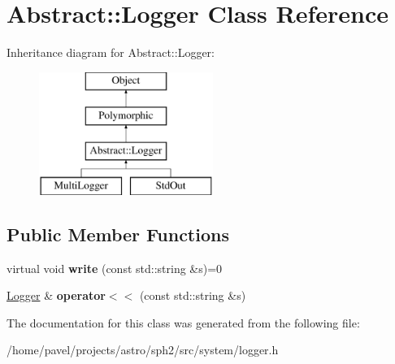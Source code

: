 \hypertarget{classAbstract_1_1Logger}{}\section{Abstract\+:\+:Logger Class Reference}
\label{classAbstract_1_1Logger}
Inheritance diagram for Abstract\+:\+:Logger\+:\begin{figure}[H]
\begin{center}
\leavevmode
\includegraphics[height=4.000000cm]{classAbstract_1_1Logger}
\end{center}
\end{figure}
\subsection*{Public Member Functions}
\begin{DoxyCompactItemize}
\item 
\hypertarget{classAbstract_1_1Logger_a9fa51f5e2c0d0965e04c4944012f8165}{}\label{classAbstract_1_1Logger_a9fa51f5e2c0d0965e04c4944012f8165} 
virtual void {\bfseries write} (const std\+::string \&s)=0
\item 
\hypertarget{classAbstract_1_1Logger_a459302696cbf474bf713661afac38e4d}{}\label{classAbstract_1_1Logger_a459302696cbf474bf713661afac38e4d} 
\hyperlink{classAbstract_1_1Logger}{Logger} \& {\bfseries operator$<$$<$} (const std\+::string \&s)
\end{DoxyCompactItemize}


The documentation for this class was generated from the following file\+:\begin{DoxyCompactItemize}
\item 
/home/pavel/projects/astro/sph2/src/system/logger.\+h\end{DoxyCompactItemize}
